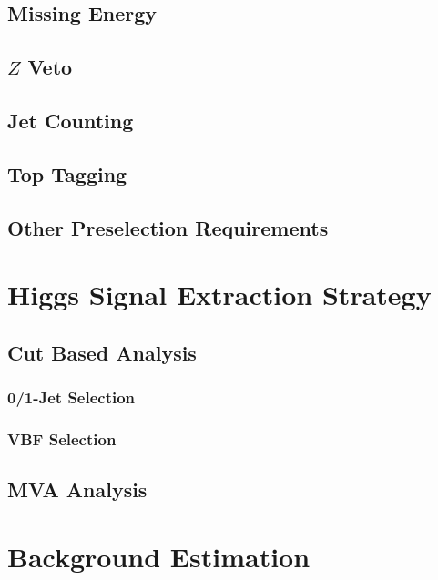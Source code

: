 \documentclass{cmspaper}
\begin{document}
   \subsection{Missing Energy} 
     \label{sec:sel_met}
     
   \subsection{$Z$ Veto}
     \label{sec:sel_zveto}
     
   \subsection{Jet Counting} 
     \label{sec:sel_jets}
     
  \subsection{Top Tagging}
     \label{sec:sel_toptag}
     
   \subsection{Other Preselection Requirements}
     \label{sec:sel_other}
     

\section{Higgs Signal Extraction Strategy}
   
   \label{sec:signal_selection}
   \subsection{Cut Based Analysis}
     \label{sec:anal_cutbased}
    \subsubsection{0/1-Jet Selection}
      \label{sec:sel_zerojet}
      
     \subsubsection{VBF Selection}
       \label{sec:sel_vbf}
       
   \subsection{MVA Analysis}
     \label{sec:anal_mva}
     

\section{Background Estimation}
     \label{sec:backgrounds}
     
     \label{sec:bkg_intro}
\end{document}
